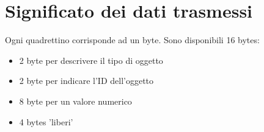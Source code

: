 \documentclass[italian]{article}
\begin{document}
    
    \section*{Significato dei dati trasmessi}
    
    Ogni quadrettino corrisponde ad un byte. Sono disponibili 16 bytes:
    
    \begin{itemize}
        \item 2 byte per descrivere il tipo di oggetto
        \item 2 byte per indicare l'ID dell'oggetto
        \item 8 byte per un valore numerico
        \item 4 bytes 'liberi' 
    \end{itemize}
    
\end{document}
